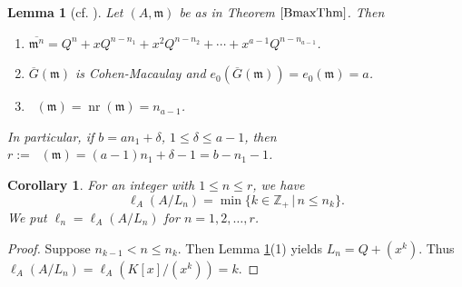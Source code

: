 \documentclass[12pt]{amsart}
\newtheorem{lem}[thm]{Lemma}
\newtheorem{cor}[thm]{Corollary}
\theoremstyle{definition}
\theoremstyle{remark}
\numberwithin{equation}{section}
\DeclareMathOperator{\nr}{nr}
\DeclareMathOperator{\br}{\bar r}
\newcommand{\m}{\mathfrak m}
\newcommand{\bbZ}{\ensuremath{\mathbb Z}}
\renewcommand{\:}{\colon}
\begin{document}
\begin{lem}[\textrm{cf. \cite{OWY4}}] \label{BmaxCM}
Let $(A,\m)$ be as in Theorem $\ref{BmaxThm}$. Then  
\begin{enumerate}
\item $\overline{\m^n}=Q^n + xQ^{n-n_1}+x^2 Q^{n-n_2}+\cdots +x^{a-1}Q^{n-n_{a-1}}$. 
\item $\overline{G}(\m)$ is Cohen-Macaulay and $e_0(\overline{G}(\m))=e_0(\m)=a$. 
\item $\br(\m)=\nr(\m)=n_{a-1}$.  
\end{enumerate}
\par \vspace{1mm}
In particular, if $b=an_1+\delta$, $1 \le \delta \le a-1$, then 
$ r:=\br(\m)  =(a-1)n_1+\delta-1 = b-n_1-1$. 
\end{lem}

\begin{cor} \label{Lncal}
For an integer with $1 \le n \le r$, we have 
\[
\ell_A(A/L_n)=\min\{k \in \bbZ_{+} \,|\, n \le n_k \}.
\]
We put $\ell_n=\ell_A(A/L_n)$ for $n=1,2,\ldots,r$. 
\end{cor}

\begin{proof}
Suppose  $n_{k-1} < n  \le n_k$. 
Then Lemma \ref{BmaxCM}(1) yields $L_n=Q+(x^k)$. 
Thus $\ell_A(A/L_n)=\ell_A(K[x]/(x^k))=k$. 
\end{proof}
\end{document}
